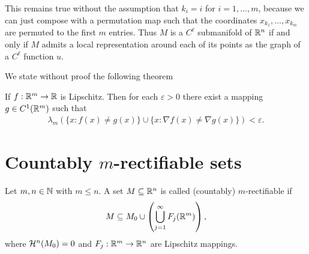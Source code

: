 This remains true without the assumption that $k_{i}=i$ for $i = 1, \dots, m$, because we can just compose with a permutation map such that the coordinates $x_{k_{1}}, \dots, x_{k_{m}}$ are permuted to the first $m$ entries. Thus $M$ is a $C^{\ell}$ submanifold of $\mathbb{R}^{n}$ if and only if $M$ admits a local representation around each of its points as the graph of a $C^{\ell}$ function $u$.



We state without proof the following theorem
\begin{theorem}\label{thm: C1 approximation theorem}
If $f : \mathbb{R}^{m} \to \mathbb{R}$ is Lipschitz. Then for each $\varepsilon > 0$ there exist a mapping $g \in C^{1}(\mathbb{R}^{m})$ such that
\begin{align*}
	\lambda_{m} ( \{ x : f(x) \neq g(x) \} \cup \{ x : \nabla f(x) \neq \nabla g(x) \} ) < \varepsilon.
\end{align*}
\end{theorem}

\section{Countably $m$-rectifiable sets}
\begin{definition}\label{def: rectifiable}
Let $m,n \in \mathbb{N}$ with $m\le n$. A set $M \subseteq \mathbb{R}^{n}$ is called (countably) $m$-rectifiable if
\begin{align*}
	M \subseteq M_{0} \cup \left( \bigcup_{j=1}^{\infty} F_{j}(\mathbb{R}^{m}) \right),
\end{align*}
where $\mathcal{H}^{n}(M_{0}) = 0$ and $F_{j}: \mathbb{R}^{m} \to \mathbb{R}^{n}$ are Lipschitz mappings.
\end{definition}

